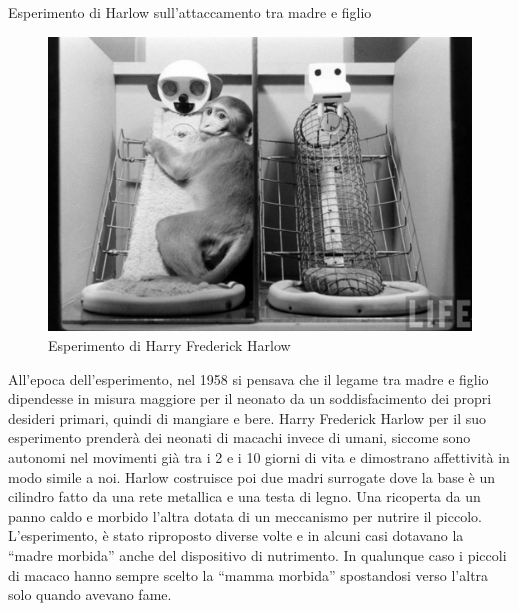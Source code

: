 \documentclass[12pt]{book} %
\begin{document}
\bigskip
\begin{mdframed}[linewidth=1pt]
Esperimento di Harlow sull'attaccamento tra madre e figlio 


\bigskip

\begin{figure}
  \centering
  \includegraphics[width=0.95\linewidth]{images/Libro-img017.jpg}
  \begin{minipage}{\linewidth}
    \caption{Esperimento di Harry Frederick Harlow}
  \end{minipage}
\end{figure}

All'epoca dell'esperimento, nel 1958 si pensava che il legame tra madre e
figlio dipendesse in misura maggiore per il neonato da un soddisfacimento dei propri desideri primari, quindi di
mangiare e bere. Harry Frederick Harlow per il suo esperimento prenderà dei neonati di macachi invece di umani, siccome
sono autonomi nel movimenti già tra i 2 e i 10 giorni di vita e dimostrano affettività in modo simile a noi. Harlow
costruisce poi due madri surrogate dove la base è un cilindro fatto da una rete metallica e una testa di legno. Una
ricoperta da un panno caldo e morbido l'altra dotata di un meccanismo per nutrire il piccolo.
L'esperimento, è stato riproposto diverse volte e in alcuni casi dotavano la “madre morbida” anche
del dispositivo di nutrimento. In qualunque caso i piccoli di macaco hanno sempre scelto la “mamma morbida” spostandosi
verso l'altra solo quando avevano fame.


\end{mdframed}
\end{document}
